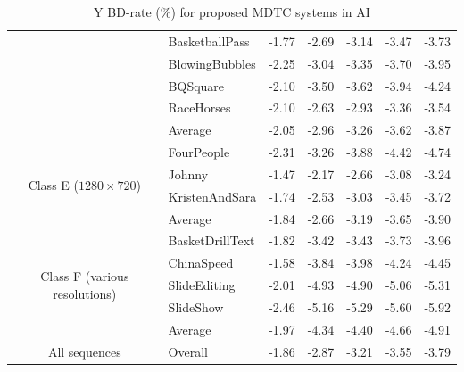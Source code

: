 \documentclass[11pt,a4paper,openright,twoside]{book}
\numberwithin{equation}{section} %
\numberwithin{figure}{section} %
\numberwithin{table}{section} %
\begin{document}
\begin{table}[tb]
\begin{tabularx}{\textwidth}{c|X|r|rrrr}
		& BasketballPass         & -1.77 & -2.69 & -3.14 & -3.47 & -3.73 \\
		& BlowingBubbles         & -2.25 & -3.04 & -3.35 & -3.70 & -3.95 \\
		& BQSquare               & -2.10 & -3.50 & -3.62 & -3.94 & -4.24 \\
		& RaceHorses             & -2.10 & -2.63 & -2.93 & -3.36 & -3.54 \\
		\cline{2-7} &
		Average                  & -2.05 & -2.96 & -3.26 & -3.62 & -3.87 \\
		\hline
		\hline
		\multirow{4}{2cm}{\centering Class E ($1280\times720$)}
		& FourPeople             & -2.31 & -3.26 & -3.88 & -4.42 & -4.74 \\
		& Johnny                 & -1.47 & -2.17 & -2.66 & -3.08 & -3.24 \\
		& KristenAndSara         & -1.74 & -2.53 & -3.03 & -3.45 & -3.72 \\
		\cline{2-7} &
		Average                  & -1.84 & -2.66 & -3.19 & -3.65 & -3.90 \\
		\hline
		\hline
		\multirow{5}{2cm}{\centering Class F (various resolutions)}
		& BasketDrillText        & -1.82 & -3.42 & -3.43 & -3.73 & -3.96 \\
		& ChinaSpeed             & -1.58 & -3.84 & -3.98 & -4.24 & -4.45 \\
		& SlideEditing           & -2.01 & -4.93 & -4.90 & -5.06 & -5.31 \\
		& SlideShow              & -2.46 & -5.16 & -5.29 & -5.60 & -5.92 \\
		\cline{2-7} &
		Average                  & -1.97 & -4.34 & -4.40 & -4.66 & -4.91 \\
		\hline
		\hline
		All sequences &
		Overall                  & -1.86 & -2.87 & -3.21 & -3.55 & -3.79 \\
	\end{tabularx}
	\caption{Y \acs{BD}-rate (\%) for proposed \acs{MDTC} systems in \acs{AI}}
	\label{tab:final_systems_ai}
\end{table}
\end{document}
